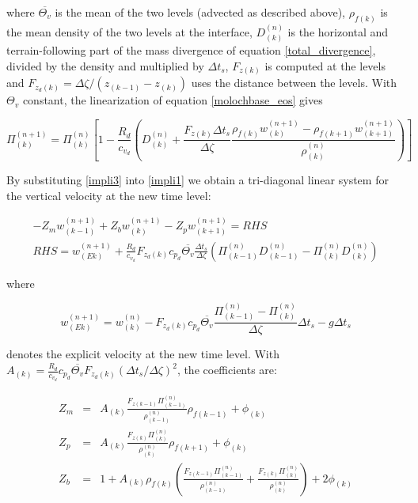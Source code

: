 where $\overline{\Theta_v}$ is the mean of the two levels (advected as
described above), $\rho_{f(k)}$ is the mean density of the two levels at the
interface, $D^{(n)}_{(k)}$ is the horizontal and terrain-following part of
the mass divergence of equation \ref{total_divergence}, divided by the density
and multiplied by $\Delta t_s$, $F_{z(k)}$ is computed at the levels and
$F_{z_d(k)} = \Delta\zeta/(z_{(k-1)} - z_{(k)})$ uses the distance between
the levels. With $\Theta_v$ constant, the linearization of equation
\ref{molochbase_eos} gives

\begin{equation}
  \label{impli3}
  \Pi^{(n+1)}_{(k)} = \Pi^{(n)}_{(k)} \left[ 1 - \frac{R_d}{c_{v_d}} \left(
      D^{(n)}_{(k)} + \frac{F_{z (k)} \Delta t_{s}}{\Delta \zeta}
      \frac{\rho_{f(k)} w^{(n+1)}_{(k)} - \rho_{f(k+1)} w^{(n+1)}_{(k+1)}}
      {\rho^{(n)}_{(k)}} \right) \right]
\end{equation}

By substituting \ref{impli3} into \ref{impli1} we obtain a tri-diagonal linear
system for the vertical velocity at the new time level:

\begin{eqnarray}
  -Z_m w^{(n+1)}_{(k-1)} + Z_b w^{(n+1)}_{(k)} -
   Z_p w^{(n+1)}_{(k+1)} = RHS \\
   RHS = w^{(n+1)}_{(Ek)} + \frac{R_d}{c_{v_d}} F_{z_d(k)}c_{p_d}
     \overline{\Theta_v} \frac{\Delta t_{s}}{\Delta \zeta} \left(
     \Pi^{(n)}_{(k-1)}D^{(n)}_{(k-1)} - \Pi^{(n)}_{(k)}D^{(n)}_{(k)}
     \right)
\end{eqnarray}

where

\begin{equation}
  w^{(n+1)}_{(Ek)} = w^{(n)}_{(k)} - F_{z_d(k)}c_{p_d} \overline{\Theta_v}
      \frac{\Pi^{(n)}_{(k-1)} - \Pi^{(n)}_{(k)}}{\Delta \zeta} \Delta t_{s} -
      g \Delta t_{s}
\end{equation}

denotes the explicit velocity at the new time level. With
$A_{(k)} = \frac{R_d}{c_{v_d}} c_{p_d} \overline{\Theta_v} F_{z_d(k)}
(\Delta t_s/\Delta \zeta)^2$, the coefficients are:

\begin{eqnarray}
  Z_m &=& A_{(k)} \frac{F_{z(k-1)} \Pi^{(n)}_{(k-1)}}{\rho^{(n)}_{(k-1)}}
    \rho_{f(k-1)} + \phi_{(k)} \\
  Z_p &=& A_{(k)} \frac{F_{z(k)} \Pi^{(n)}_{(k)}}{\rho^{(n)}_{(k)}}
    \rho_{f(k+1)} + \phi_{(k)} \\
  Z_b &=& 1 + A_{(k)} \rho_{f(k)} \left(
    \frac{F_{z(k-1)} \Pi^{(n)}_{(k-1)}}{\rho^{(n)}_{(k-1)}} +
    \frac{F_{z(k)} \Pi^{(n)}_{(k)}}{\rho^{(n)}_{(k)}} \right) + 2\phi_{(k)}
\end{eqnarray}

